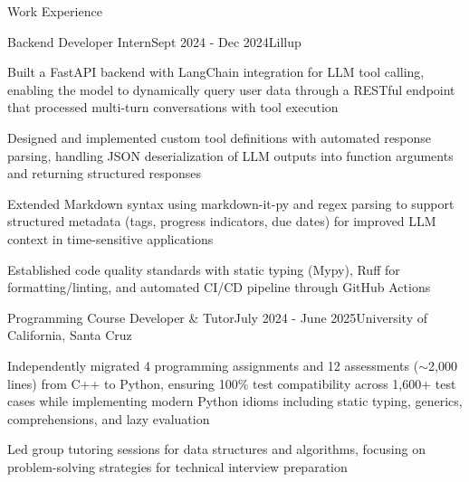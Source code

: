 \documentclass{resume}
\begin{document}
\begin{rSection}{Work Experience}

  \begin{rSubsection}{Backend Developer Intern}{Sept 2024 - Dec 2024}{Lillup}{}
  \item{} Built a FastAPI backend with LangChain integration for LLM
    tool calling, enabling the model to dynamically query user data
    through a RESTful endpoint that processed multi-turn
    conversations with tool execution
  \item{} Designed and implemented custom tool definitions with
    automated response parsing, handling JSON deserialization of LLM
    outputs into function arguments and returning structured responses
  \item{} Extended Markdown syntax using markdown-it-py and regex parsing
    to support structured metadata (tags, progress indicators, due
    dates) for improved LLM context in time-sensitive applications
  \item{} Established code quality standards with static typing (Mypy),
    Ruff for formatting/linting, and automated CI/CD pipeline through
    GitHub Actions
  \end{rSubsection}

  \begin{rSubsection}{Programming Course Developer \& Tutor}{July
    2024 - June 2025}{University of California, Santa Cruz}{}
  \item{} Independently migrated 4 programming assignments and 12
    assessments ($\sim$2,000 lines) from C++ to Python,
    ensuring 100\%
    test compatibility across 1,600+ test cases while implementing
    modern Python idioms including static typing, generics,
    comprehensions, and lazy evaluation
  \item{} Led group tutoring sessions for data structures and
    algorithms, focusing on problem-solving strategies for technical
    interview preparation
  \end{rSubsection}

\end{rSection}
\end{document}
